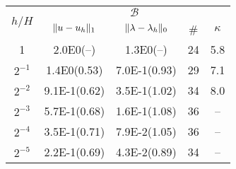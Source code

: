\begin{table}
{\begin{minipage}{0.49\textwidth}
\begin{center}
  \end{center}
  \end{minipage}
  }
  \scriptsize{%
    \begin{minipage}{0.49\textwidth}
  \begin{center}
    \begin{tabular}{c|cccc}
      \hline
      \multirow{2}{*}{$h/H$} & \multicolumn{4}{c|}{$\mathcal{B}$}\\
      \cline{2-5}
      & $\lVert{u-u_h}\rVert_1$ & $\lVert{\lambda-\lambda_h}\rVert_0$ & \# & $\kappa$\\
      \hline
1       & 2.0E0(--) & 1.3E0(--)        & 24 & 5.8\\
$2^{-1}$ & 1.4E0(0.53) & 7.0E-1(0.93)   & 29 & 7.1\\
$2^{-2}$ & 9.1E-1(0.62) & 3.5E-1(1.02)  & 34 & 8.0\\
$2^{-3}$ & 5.7E-1(0.68) & 1.6E-1(1.08)  & 36 & -- \\
$2^{-4}$ & 3.5E-1(0.71) & 7.9E-2(1.05)  & 36 & -- \\
$2^{-5}$ & 2.2E-1(0.69) & 4.3E-2(0.89)  & 34 & -- \\
      \hline
  \end{tabular}
  \end{center}
  \end{minipage}
  }
  \caption{}
  \label{}
\end{table}
